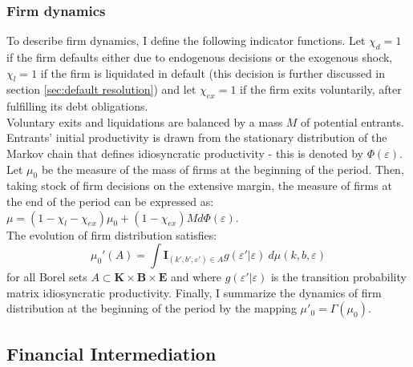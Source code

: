 \documentclass[12pt]{article}
\begin{document}
\subsubsection{Firm dynamics}
To describe firm dynamics, I define the following indicator functions. Let $\chi_{d} = 1$ if the firm defaults either due to endogenous decisions or the exogenous shock, $\chi_l = 1$ if the firm is liquidated in default (this decision is further discussed in section \ref{sec:default resolution}) and let $\chi_{ex} = 1$ if the firm exits voluntarily, after fulfilling its debt obligations. \vspace{3mm} \\
Voluntary exits and liquidations are balanced by a mass $M$ of potential entrants. Entrants' initial productivity is drawn from the stationary distribution of the Markov chain that defines idiosyncratic productivity - this is denoted by $\Phi(\varepsilon)$. Let $\mu_0$ be the measure of the mass of firms at the beginning of the period. Then, taking stock of firm decisions on the extensive margin, the measure of firms at the end of the period can be expressed as: $\mu = (1 - \chi_l - \chi_{ex}) \mu_0 + (1 - \chi_{ex}) M d \Phi(\varepsilon) $. \vspace{3mm} \\
The evolution of firm distribution satisfies: 
\begin{equation} \label{eq_firmdim} 
	\mu_{0}'(A) = \int \mathbf{I}_{(k', b', \varepsilon') \in A} g(\varepsilon'|\varepsilon) \ d \mu (k,b,\varepsilon)
\end{equation}
for all Borel sets $A \subset \mathbf{K} \times \mathbf{B} \times \mathbf{E} $ and where $g(\varepsilon'|\varepsilon)$ is the transition probability matrix idiosyncratic productivity. Finally, I summarize the dynamics of firm distribution at the beginning of the period by the mapping $ \mu'_0 =\Gamma(\mu_0)$.


\subsection{Financial Intermediation}  \label{sec: Financial Intermediation}
\end{document}
